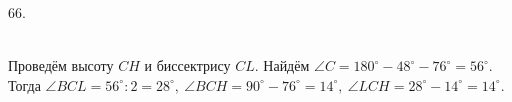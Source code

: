 66. \begin{figure}[ht!]
\end{figure}\\
Проведём высоту $CH$ и биссектрису $CL.$ Найдём $\angle C=180^\circ-48^\circ-76^\circ=56^\circ.$ Тогда $\angle BCL=56^\circ:2=28^\circ,\ \angle BCH=90^\circ-76^\circ=14^\circ,\ \angle LCH=28^\circ-14^\circ=14^\circ.$\\
